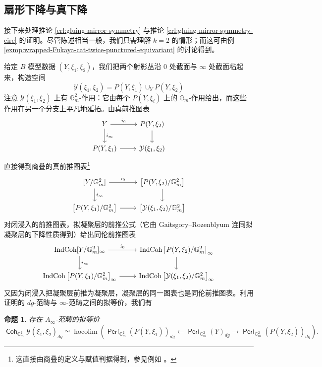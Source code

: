 \documentclass[11pt,a4paper]{article}
\DeclareMathOperator*{\hocolim}{hocolim}
\DeclareMathOperator{\Coh}{\mathsf{Coh}}
\DeclareMathOperator{\Perf}{\mathsf{Perf}}
\DeclareMathOperator{\IndCoh}{IndCoh}
\theoremstyle{cnth}
\newtheorem{prp}[thm]{命题}
\begin{document}
\subsection{扇形下降与真下降}

接下来处理推论 \ref{crl:gluing-mirror-symmetry} 与推论 \ref{crl:gluing-mirror-symmetry-circ} 的证明。尽管陈述相当一般，我们只需理解 $k=2$ 的情形；而这可由例 \ref{exmp:wrapped-Fukaya-cat-twice-punctured-equivariant} 的讨论得到。

给定 $B$ 模型数据 $(Y,\xi_1,\xi_2)$，我们把两个射影丛沿 $0$ 处截面与 $\infty$ 处截面粘起来，构造空间
\[
    \mathcal{Y} (\xi_1,\xi_2)=P(Y,\xi_1)\cup_Y P(Y,\xi_2)
\]
注意 $\mathcal{Y} (\xi_1,\xi_2)$ 上有 $\mathbb{G}_m^2$-作用：它由每个 $P(Y,\xi_i)$ 上的 $\mathbb{G}_m$-作用给出，而这些作用在另一个分支上平凡地延拓。由真前推图表
\[
    \begin{tikzcd}
        Y\arrow[r,"i_0"]\arrow[d,"i_{\infty}"]&P(Y,\xi_2)\arrow[d]\\ 
        P(Y,\xi_1)\arrow[r]&\mathcal{Y} (\xi_1,\xi_2)
    \end{tikzcd}
\]
直接得到商叠的真前推图表\footnote{这直接由商叠的定义与赋值判据得到，参见例如 \cite{Alper26}。} \[
    \begin{tikzcd}
        {[Y/\mathbb{G}_m^2]}\arrow[r,"i_0"]\arrow[d,"i_{\infty}"]&{\big[P(Y,\xi_2)/\mathbb{G}_m^2\big]}\arrow[d]\\ 
        \big[P(Y,\xi_1)/\mathbb{G}_m^2\big]\arrow[r]&\big[\mathcal{Y}(\xi_1,\xi_2)/\mathbb{G}_m^2\big]
    \end{tikzcd}
\]
对闭浸入的前推图表，拟凝聚层的前推公式（它由 Gaitsgory--Rozenblyum \cite[Theorem A.1.2]{GR17II} 连同拟凝聚层的下降性质得到）给出同伦前推图表 \[
    \begin{tikzcd}
        {\IndCoh [Y/\mathbb{G}_m^2]_{\infty}}\arrow[r,"i_0"]\arrow[d,"i_{\infty}"]&{\IndCoh\big[P(Y,\xi_2)/\mathbb{G}_m^2\big]_{\infty}}\arrow[d]\\ 
        \IndCoh\big[P(Y,\xi_1)/\mathbb{G}_m^2\big]_{\infty}\arrow[r]&\IndCoh\big[\mathcal{Y}(\xi_1,\xi_2)/\mathbb{G}_m^2\big]_{\infty}
    \end{tikzcd}
\]又因为闭浸入把凝聚层前推为凝聚层，凝聚层的同一图表也是同伦前推图表。利用 \cite{Cohn16} 证明的 $dg$-范畴与 $\infty$-范畴之间的拟等价，我们有

\begin{prp}\label{prp:pushforward-coherent-stack}
    存在 $A_{\infty}$-范畴的拟等价 \[
        \Coh_{\mathbb{G}_m^2}\mathcal{Y} (\xi_1,\xi_2)_{dg}\simeq\hocolim\left(\Perf_{\mathbb{G}_m^2} (P(Y,\xi_1))_{dg}\leftarrow\Perf_{\mathbb{G}_m^2} (Y)_{dg}\rightarrow\Perf_{\mathbb{G}_m^2} (P(Y,\xi_2))_{dg}\right).
    \]
\end{prp}
\end{document}
